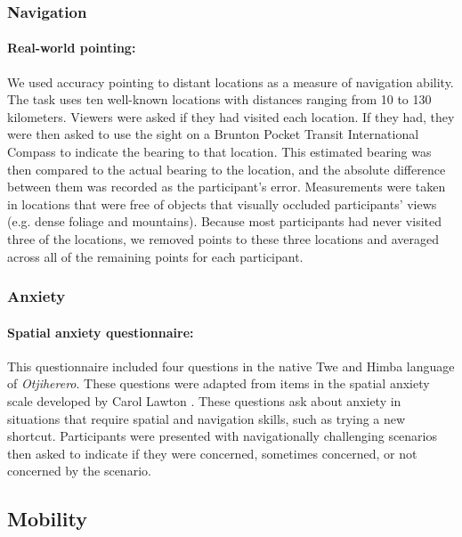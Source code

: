 		\subsubsection{Navigation}
		\label{sec:2.2.2}
\paragraph{Real-world pointing:}  We used accuracy pointing to distant locations as a measure of navigation ability. The task uses ten well-known locations with distances ranging from 10 to 130 kilometers.  Viewers were asked if they had visited each location. If they had, they were then asked to use the sight on a Brunton Pocket Transit International Compass to indicate the bearing to that location. This estimated bearing was then compared to the actual bearing to the location, and the absolute difference between them was recorded as the participant's error. Measurements were taken in locations that were free of objects that visually occluded participants' views (e.g. dense foliage and mountains).  Because most participants had never visited three of the locations, we removed points to these three locations and averaged across all of the remaining points for each participant.

		\subsubsection{Anxiety}
		\label{sec:2.2.3}
		
\paragraph{Spatial anxiety questionnaire:}  This questionnaire included four questions in the native Twe and Himba language of \emph{Otjiherero}.  These questions were adapted from items in the spatial anxiety scale developed by Carol Lawton \citep{lawton1994gender}.  These questions ask about anxiety in situations that require spatial and navigation skills, such as trying a new shortcut. Participants were presented with navigationally challenging scenarios then asked to indicate if they were concerned, sometimes concerned, or not concerned by the scenario.

	\subsection{Mobility}
	\label{sec:2.2.4}
	
